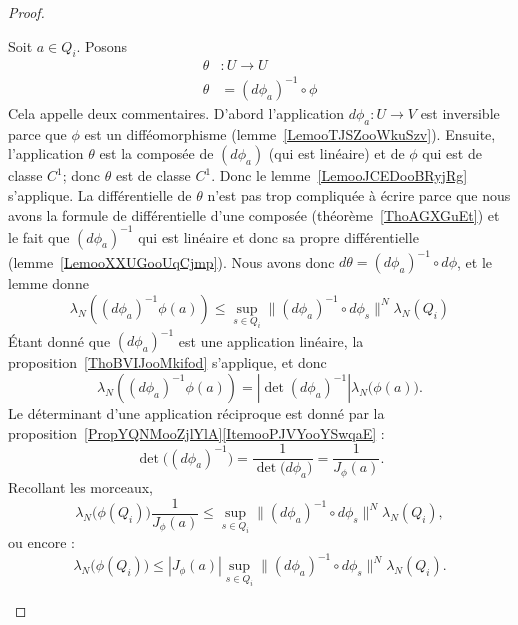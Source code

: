 \begin{proof}
\begin{enumerate}
\begin{subproof}
			      Soit \( a\in Q_i\). Posons
			      \begin{equation}
				      \begin{aligned}
					      \theta & \colon U                    \to U \\
					      \theta & =(d\phi_{a})^{-1}\circ\phi
				      \end{aligned}
			      \end{equation}
			      Cela appelle deux commentaires. D'abord l'application \( d\phi_{a}\colon U\to V\) est inversible parce que \( \phi\) est un difféomorphisme (lemme~\ref{LemooTJSZooWkuSzv}). Ensuite, l'application \( \theta\) est la composée de \( (d\phi_{a})\) (qui est linéaire) et de \( \phi\) qui est de classe \( C^1\); donc \( \theta\) est de classe \( C^1\). Donc le lemme~\ref{LemooJCEDooBRyjRg} s'applique. La différentielle de \( \theta\) n'est pas trop compliquée à écrire parce que nous avons la formule de différentielle d'une composée (théorème~\ref{ThoAGXGuEt}) et le fait que \( (d\phi_{a})^{-1}\) qui est linéaire et donc sa propre différentielle (lemme~\ref{LemooXXUGooUqCjmp}). Nous avons donc \( d\theta=(d\phi_a)^{-1}\circ d\phi\), et le lemme donne
			      \begin{equation}
				      \lambda_N\left( (d\phi_a)^{-1}\phi(a) \right)\leq \sup_{s\in Q_i}\|    (d\phi_a)^{-1}\circ d\phi_s  \|^N\lambda_N(Q_i)
			      \end{equation}
			      Étant donné que \( (d\phi_a)^{-1}\) est une application linéaire, la proposition~\ref{ThoBVIJooMkifod} s'applique, et donc
			      \begin{equation}
				      \lambda_N\left( (d\phi_a)^{-1}\phi(a) \right)=| \det(d\phi_a)^{-1} |\lambda_N\big( \phi(a) \big).
			      \end{equation}
			      Le déterminant d'une application réciproque est donné par la proposition~\ref{PropYQNMooZjlYlA}\ref{ItemooPJVYooYSwqaE} :
			      \begin{equation}
				      \det\big( (d\phi_a)^{-1} \big)=\frac{1}{ \det\big( d\phi_a \big) }=\frac{1}{ J_{\phi}(a) }.
			      \end{equation}
			      Recollant les morceaux,
			      \begin{equation}
				      \lambda_N\big( \phi(Q_i) \big)\frac{1}{ J_{\phi}(a) }\leq \sup_{s\in Q_i}\| (d\phi_a)^{-1}\circ d\phi_s \|^N\lambda_N(Q_i),
			      \end{equation}
			      ou encore :
			      \begin{equation}
				      \lambda_N\big( \phi(Q_i) \big)\leq | J_{\phi}(a) |\sup_{s\in Q_i}\| (d\phi_a)^{-1}\circ d\phi_s \|^N\lambda_N(Q_i).

\end{equation}
\end{subproof}
\end{enumerate}
\end{proof}
